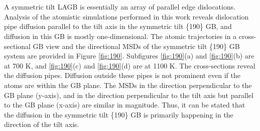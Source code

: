 \documentclass{elsarticle}
\providecommand{\DIFadd}[1]{{\protect\color{blue} \sf #1}} %
\providecommand{\DIFdel}[1]{}
\providecommand{\DIFaddbegin}{} %
\providecommand{\DIFaddend}{} %
\providecommand{\DIFdelbegin}{} %
\providecommand{\DIFdelend}{} %
\begin{document}
\section{\DIFdel{Discussion}}
\addtocounter{section}{-1}%

\subsection{\DIFdel{Nature of diffusion}}
\addtocounter{subsection}{-1}%

\DIFdel{GBs can be interpreted as collections of dislocations and a pure tilt GB }\DIFdelend \DIFaddbegin \DIFadd{A symmetric tilt LAGB }\DIFaddend is essentially an array of parallel edge dislocations. Analysis of the atomistic simulations performed in this work reveals dislocation pipe diffusion \DIFdelbegin \DIFdel{in symmetric tilt LAGBs, and this diffusion }\DIFdelend \DIFaddbegin \DIFadd{parallel to the tilt axis in the symmetric tilt \{190\} GB, and diffusion in this GB }\DIFaddend is mostly one-dimensional\DIFdelbegin \DIFdel{where the diffusion pipes are parallel to the tilt axis}\DIFdelend . The atomic trajectories in a cross-sectional GB view and the directional MSDs of the symmetric tilt \{190\} \DIFaddbegin \DIFadd{GB system }\DIFaddend are provided in Figure \ref{fig:190}. Subfigures \ref{fig:190}(a) and \ref{fig:190}(b) are at 700 K, and \ref{fig:190}(c) and \ref{fig:190}(d) are at 1100 K. The cross-sections reveal the diffusion pipes. Diffusion outside these pipes is not prominent even if the atoms are within the GB plane. \DIFdelbegin \DIFdel{This explains why the effective GB width as defined in section \ref{sec:res1} can sometimes be less than the lattice parameter, as not all atoms at the GB are participating in the diffusion. }\DIFdelend The MSDs in the direction perpendicular to the GB plane (y-axis), and in the direction perpendicular to the tilt axis but parallel to the GB plane (x-axis) are similar in magnitude. Thus, it can be stated that the diffusion in the symmetric tilt \{190\} GB is primarily happening in the direction of the tilt axis.
\end{document}
